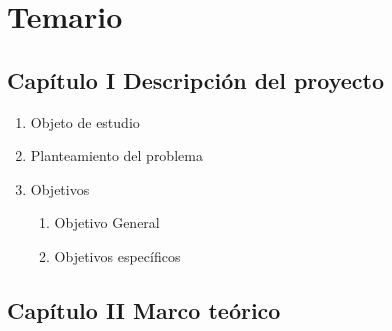 \section{Temario}
\label{temario}


\subsection{Capítulo I Descripción del proyecto}
		\begin{enumerate}
			\item Objeto de estudio
			\item Planteamiento del problema
			\item Objetivos
				\begin{enumerate}
					\item Objetivo General
					\item Objetivos específicos 
				\end{enumerate}		
		\end{enumerate}
		
\subsection{Capítulo II Marco teórico}

